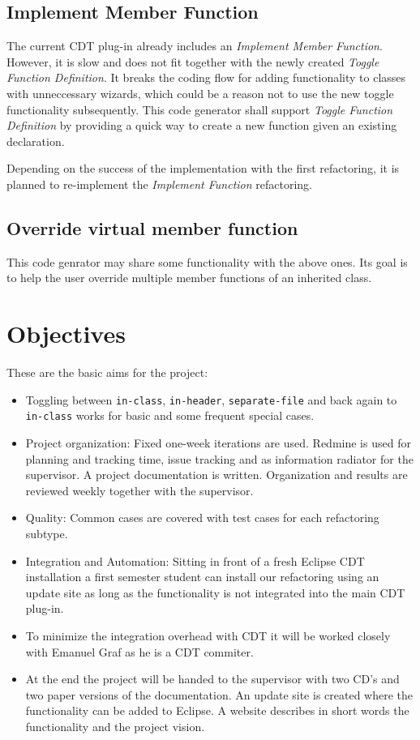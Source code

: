 \subsection{Implement Member Function}
The current CDT plug-in already includes an \textit{Implement Member Function}.
However, it is slow and does not fit together with the newly created 
\textit{Toggle Function Definition}. It breaks the coding flow for adding 
functionality to classes with unneccessary wizards, which could be a reason not 
to use the new toggle functionality subsequently. This code generator shall 
support \textit{Toggle Function Definition} by providing a quick way to create a 
new function given an existing declaration.

Depending on the success of the implementation with the first refactoring, it is 
planned to re-implement the \textit{Implement Function} refactoring.

\subsection{Override virtual member function}
This code genrator may share some functionality with the above ones. Its goal is 
to help the user override multiple member functions of an inherited class.

\section{Objectives}

These are the basic aims for the project:
\begin{itemize}
 \item Toggling between \texttt{in-class}, \texttt{in-header},
\texttt{separate-file} and back again to \texttt{in-class} works for basic and
some frequent special cases.
 \item Project organization: Fixed one-week iterations are used. Redmine is used
for planning and tracking time, issue tracking and as information radiator for
the supervisor. A project documentation is written. Organization and results are
reviewed weekly together with the supervisor.
 \item Quality: Common cases are covered with test cases for each
refactoring subtype.
 \item Integration and Automation: Sitting in front of a fresh Eclipse CDT
installation a first semester student can install our refactoring using an
update site as long as the functionality is not integrated into the main CDT
plug-in.
 \item To minimize the integration overhead with CDT it will be worked closely
with Emanuel Graf as he is a CDT commiter.
 \item At the end the project will be handed to the supervisor with two CD's and
two paper versions of the documentation. An update site is created where the
functionality can be added to Eclipse. A website describes in short words the
functionality and the project vision.
\end{itemize}

